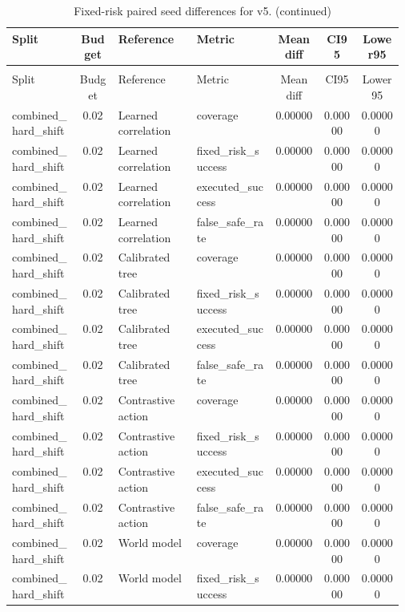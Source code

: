 \documentclass{article}
\begin{document}
\begin{center}
\scriptsize
\begin{longtable}{p{0.17\linewidth}cp{0.20\linewidth}p{0.20\linewidth}ccc}
\caption{Fixed-risk paired seed differences for v5.}\label{tab:fixed-pairs}\\
\toprule
Split & Budget & Reference & Metric & Mean diff & CI95 & Lower95\\
\midrule
\endfirsthead
\caption[]{Fixed-risk paired seed differences for v5. (continued)}\\
\toprule
Split & Budget & Reference & Metric & Mean diff & CI95 & Lower95\\
\midrule
\endhead
combined\_hard\_shift & 0.02 & Learned correlation & coverage & 0.00000 & 0.00000 & 0.00000\\
combined\_hard\_shift & 0.02 & Learned correlation & fixed\_risk\_success & 0.00000 & 0.00000 & 0.00000\\
combined\_hard\_shift & 0.02 & Learned correlation & executed\_success & 0.00000 & 0.00000 & 0.00000\\
combined\_hard\_shift & 0.02 & Learned correlation & false\_safe\_rate & 0.00000 & 0.00000 & 0.00000\\
combined\_hard\_shift & 0.02 & Calibrated tree & coverage & 0.00000 & 0.00000 & 0.00000\\
combined\_hard\_shift & 0.02 & Calibrated tree & fixed\_risk\_success & 0.00000 & 0.00000 & 0.00000\\
combined\_hard\_shift & 0.02 & Calibrated tree & executed\_success & 0.00000 & 0.00000 & 0.00000\\
combined\_hard\_shift & 0.02 & Calibrated tree & false\_safe\_rate & 0.00000 & 0.00000 & 0.00000\\
combined\_hard\_shift & 0.02 & Contrastive action & coverage & 0.00000 & 0.00000 & 0.00000\\
combined\_hard\_shift & 0.02 & Contrastive action & fixed\_risk\_success & 0.00000 & 0.00000 & 0.00000\\
combined\_hard\_shift & 0.02 & Contrastive action & executed\_success & 0.00000 & 0.00000 & 0.00000\\
combined\_hard\_shift & 0.02 & Contrastive action & false\_safe\_rate & 0.00000 & 0.00000 & 0.00000\\
combined\_hard\_shift & 0.02 & World model & coverage & 0.00000 & 0.00000 & 0.00000\\
combined\_hard\_shift & 0.02 & World model & fixed\_risk\_success & 0.00000 & 0.00000 & 0.00000\\

\end{longtable}
\end{center}
\end{document}
